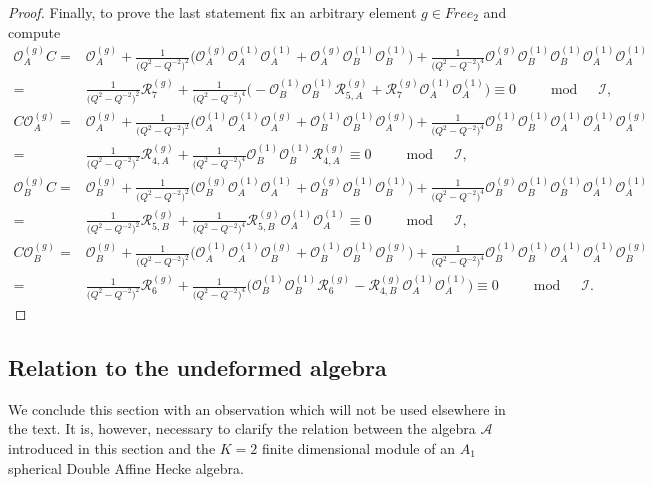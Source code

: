 \documentclass{amsart}
\newcommand{\Oa}{\mathcal O_A}
\newcommand{\Ob}{\mathcal O_B}
\newcommand{\R}{\mathcal R}
\begin{document}
\begin{proof}
Finally, to prove the last statement fix an arbitrary element $g\in Free_2$ and compute
\begin{align*}
\Oa^{(g)}C=&\Oa^{(g)}+\frac1{\big(Q^2-Q^{-2}\big)^2}\Big(\Oa^{(g)}\Oa^{(1)}\Oa^{(1)}+\Oa^{(g)}\Ob^{(1)}\Ob^{(1)}\Big)+\frac1{\big(Q^2-Q^{-2}\big)^4}\Oa^{(g)}\Ob^{(1)}\Ob^{(1)}\Oa^{(1)}\Oa^{(1)}\\
=&\frac1{\big(Q^2-Q^{-2}\big)^2}\R_{7}^{(g)}+\frac1{\big(Q^2-Q^{-2}\big)^4}\Big(-\Ob^{(1)}\Ob^{(1)}\R_{5,A}^{(g)}+\R_{7}^{(g)}\Oa^{(1)}\Oa^{(1)}\Big)\equiv0\qquad\bmod\quad\mathcal I,\\[0.7em]
C\Oa^{(g)}=&\Oa^{(g)}+\frac1{\big(Q^2-Q^{-2}\big)^2}\Big(\Oa^{(1)}\Oa^{(1)}\Oa^{(g)}+\Ob^{(1)}\Ob^{(1)}\Oa^{(g)}\Big)+\frac1{\big(Q^2-Q^{-2}\big)^4}\Ob^{(1)}\Ob^{(1)}\Oa^{(1)}\Oa^{(1)}\Oa^{(g)}\\
=&\frac1{\big(Q^2-Q^{-2}\big)^2}\R_{4,A}^{(g)}+\frac1{\big(Q^2-Q^{-2}\big)^4}\Ob^{(1)}\Ob^{(1)}\R_{4,A}^{(g)}\equiv0\qquad\bmod\quad\mathcal I,\\[0.7em]
\Ob^{(g)}C=&\Ob^{(g)}+\frac1{\big(Q^2-Q^{-2}\big)^2}\Big(\Ob^{(g)}\Oa^{(1)}\Oa^{(1)}+\Ob^{(g)}\Ob^{(1)}\Ob^{(1)}\Big)+\frac1{\big(Q^2-Q^{-2}\big)^4}\Ob^{(g)}\Ob^{(1)}\Ob^{(1)}\Oa^{(1)}\Oa^{(1)}\\
=&\frac1{\big(Q^2-Q^{-2}\big)^2}\R_{5,B}^{(g)}+\frac1{\big(Q^2-Q^{-2}\big)^4}\R_{5,B}^{(g)}\Oa^{(1)}\Oa^{(1)}\equiv0\qquad\bmod\quad\mathcal I,\\[0.7em]
C\Ob^{(g)}=&\Ob^{(g)}+\frac1{\big(Q^2-Q^{-2}\big)^2}\Big(\Oa^{(1)}\Oa^{(1)}\Ob^{(g)}+\Ob^{(1)}\Ob^{(1)}\Ob^{(g)}\Big)+\frac1{\big(Q^2-Q^{-2}\big)^4}\Ob^{(1)}\Ob^{(1)}\Oa^{(1)}\Oa^{(1)}\Ob^{(g)}\\
=&\frac1{\big(Q^2-Q^{-2}\big)^2}\R_{6}^{(g)}+\frac1{\big(Q^2-Q^{-2}\big)^4}\Big(\Ob^{(1)}\Ob^{(1)}\R_{6}^{(g)}-\R_{4,B}^{(g)}\Oa^{(1)}\Oa^{(1)}\Big)\equiv0\qquad\bmod\quad\mathcal I.
\end{align*}
\end{proof}

\subsection{Relation to the undeformed algebra}

We conclude this section with an observation which will not be used elsewhere in the text. It is, however, necessary to clarify the relation between the algebra $\mathcal A$ introduced in this section and the $K=2$ finite dimensional module of an $A_1$ spherical Double Affine Hecke algebra.
\end{document}
